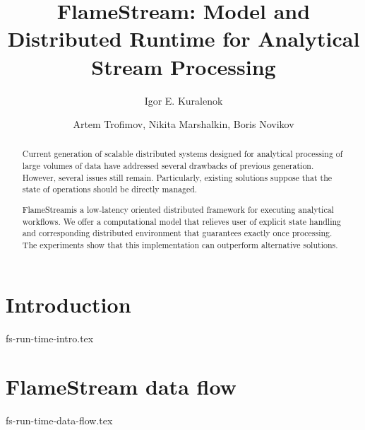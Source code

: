\documentclass[sigconf]{acmart-edbt2018}
\theoremstyle{remark}
\newcommand {\FlameStream} {FlameStream}
\begin{document}
\title {\FlameStream: Model and Distributed Runtime for Analytical Stream Processing}


\author{Igor E. Kuralenok}

\author{Artem Trofimov, Nikita Marshalkin, Boris Novikov}


\begin{abstract}
Current generation of scalable distributed systems designed for analytical processing of large volumes of data have addressed several drawbacks of previous generation. However, several issues still remain. Particularly, existing solutions suppose that the state of operations should be directly managed.

\FlameStream is a low-latency oriented distributed framework for executing analytical workflows. We offer a computational model that relieves user of explicit state handling and corresponding distributed environment that guarantees exactly once processing. The experiments show that this implementation can outperform alternative solutions.
\end {abstract}

\maketitle


\section {Introduction}
 {fs-run-time-intro.tex}

\section {FlameStream data flow}
 {fs-run-time-data-flow.tex}
\end{document}
